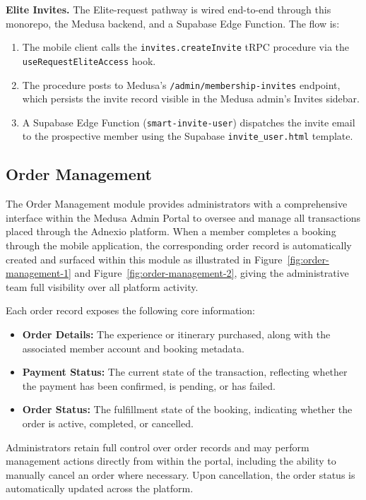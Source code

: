 
\textbf{Elite Invites.} The Elite-request pathway is wired end-to-end through this monorepo, the Medusa backend, and a Supabase Edge Function. The flow is:
\begin{enumerate}
  \item The mobile client calls the \texttt{invites.\allowbreak createInvite} tRPC procedure via the \texttt{use\allowbreak Request\allowbreak Elite\allowbreak Access} hook.
  \item The procedure posts to Medusa's \texttt{/admin/membership-invites} endpoint, which persists the invite record visible in the Medusa admin's Invites sidebar.
  \item A Supabase Edge Function (\texttt{smart-invite-user}) dispatches the invite email to the prospective member using the Supabase \texttt{invite\_user.html} template.
\end{enumerate}

\subsection{Order Management}
The Order Management module provides administrators with a comprehensive interface within the Medusa Admin Portal to oversee and manage all transactions placed through the Adnexio platform. When a member completes a booking through the mobile application, the corresponding order record is automatically created and surfaced within this module as illustrated in Figure~\ref{fig:order-management-1} and Figure~\ref{fig:order-management-2}, giving the administrative team full visibility over all platform activity.



Each order record exposes the following core information:
\begin{itemize}
  \item \textbf{Order Details:} The experience or itinerary purchased, along with the associated member account and booking metadata.
  \item \textbf{Payment Status:} The current state of the transaction, reflecting whether the payment has been confirmed, is pending, or has failed.
  \item \textbf{Order Status:} The fulfillment state of the booking, indicating whether the order is active, completed, or cancelled.
\end{itemize}
Administrators retain full control over order records and may perform management actions directly from within the portal, including the ability to manually cancel an order where necessary. Upon cancellation, the order status is automatically updated across the platform.

